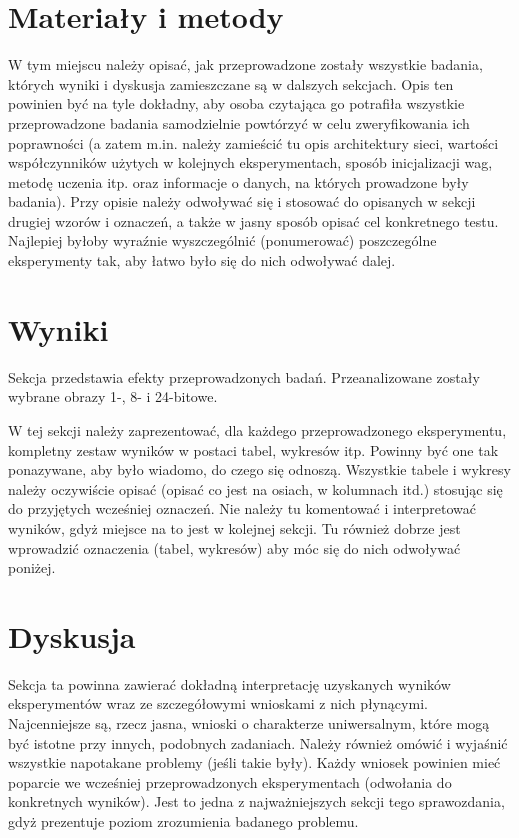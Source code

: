 \documentclass{classrep}
\begin{document}
\section{Materiały i metody}
{\color{blue}
W tym miejscu należy opisać, jak przeprowadzone zostały wszystkie badania,
których wyniki i dyskusja zamieszczane są w dalszych sekcjach. Opis ten
powinien być na tyle dokładny, aby osoba czytająca go potrafiła wszystkie
przeprowadzone badania samodzielnie powtórzyć w celu zweryfikowania ich
poprawności (a zatem m.in. należy zamieścić tu opis architektury sieci,
wartości współczynników użytych w kolejnych eksperymentach, sposób
inicjalizacji wag, metodę uczenia itp. oraz informacje o danych, na których
prowadzone były badania). Przy opisie należy odwoływać się i stosować do
opisanych w sekcji drugiej wzorów i oznaczeń, a także w jasny sposób opisać
cel konkretnego testu. Najlepiej byłoby wyraźnie wyszczególnić (ponumerować)
poszczególne eksperymenty tak, aby łatwo było się do nich odwoływać dalej.}

\section{Wyniki}
Sekcja przedstawia efekty przeprowadzonych badań. Przeanalizowane zostały wybrane obrazy 1-, 8- i 24-bitowe.

{\color{blue}
W tej sekcji należy zaprezentować, dla każdego przeprowadzonego eksperymentu,
kompletny zestaw wyników w postaci tabel, wykresów itp. Powinny być one tak
ponazywane, aby było wiadomo, do czego się odnoszą. Wszystkie tabele i wykresy
należy oczywiście opisać (opisać co jest na osiach, w kolumnach itd.) stosując
się do przyjętych wcześniej oznaczeń. Nie należy tu komentować i interpretować
wyników, gdyż miejsce na to jest w kolejnej sekcji. Tu również dobrze jest
wprowadzić oznaczenia (tabel, wykresów) aby móc się do nich odwoływać
poniżej.}

\section{Dyskusja}
{\color{blue}
Sekcja ta powinna zawierać dokładną interpretację uzyskanych wyników
eksperymentów wraz ze szczegółowymi wnioskami z nich płynącymi. Najcenniejsze
są, rzecz jasna, wnioski o charakterze uniwersalnym, które mogą być istotne
przy innych, podobnych zadaniach. Należy również omówić i wyjaśnić wszystkie
napotakane problemy (jeśli takie były). Każdy wniosek powinien mieć poparcie
we wcześniej przeprowadzonych eksperymentach (odwołania do konkretnych
wyników). Jest to jedna z najważniejszych sekcji tego sprawozdania, gdyż
prezentuje poziom zrozumienia badanego problemu.}
\end{document}
